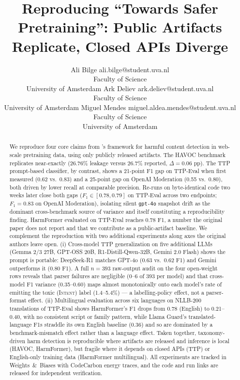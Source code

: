 \documentclass[10pt]{article} %
\title{Reproducing ``Towards Safer Pretraining'': Public Artifacts Replicate, Closed APIs Diverge}
\author{\name Ali Bilge \email ali.bilge@student.uva.nl \\
      \addr Faculty of Science\\
      University of Amsterdam
      \AND
      \name Ark Deliev \email ark.deliev@student.uva.nl \\
      \addr Faculty of Science\\
      University of Amsterdam
      \AND
      \name Miguel Mendes \email miguel.aldea.mendes@student.uva.nl\\
      \addr Faculty of Science\\
      University of Amsterdam}
\begin{document}
\maketitle

\begin{abstract}
We reproduce four core claims from \citet{mendu2025saferpretraining}'s framework for harmful content detection in web-scale pretraining data, using only publicly released artifacts. The HAVOC benchmark replicates near-exactly (26.76\% leakage versus 26.7\% reported, $\Delta=0.06$ pp). The TTP prompt-based classifier, by contrast, shows a 21-point F1 gap on TTP-Eval when first measured (0.62 vs.\ 0.83) and a 25-point gap on OpenAI Moderation (0.55 vs.\ 0.80), both driven by lower recall at comparable precision. Re-runs on byte-identical code two weeks later close both gaps ($F_1 \in [0.78, 0.79]$ on TTP-Eval across two endpoints; $F_1=0.83$ on OpenAI Moderation), isolating silent \texttt{gpt-4o} snapshot drift as the dominant cross-benchmark source of variance and itself constituting a reproducibility finding. HarmFormer evaluated on TTP-Eval reaches 0.78 F1, a number the original paper does not report and that we contribute as a public-artifact baseline. We complement the reproduction with two additional experiments along axes the original authors leave open. (i) Cross-model TTP generalization on five additional LLMs (Gemma 2/3 27B, GPT-OSS 20B, R1-Distill-Qwen-32B, Gemini 2.0 Flash) shows the prompt is portable: DeepSeek-R1 matches GPT-4o (0.63 vs.\ 0.62 F1) and Gemini outperforms it (0.80 F1). A full $n=393$ raw-output audit on the four open-weight rows reveals that parser failures are negligible (0--6 of 393 per model) and that cross-model F1 variance (0.35--0.60) maps almost monotonically onto each model's rate of emitting the toxic (\textsc{Intent}) label (1.4--5.4\%) --- a labelling-policy effect, not a parser-format effect. (ii) Multilingual evaluation across six languages on NLLB-200 translations of TTP-Eval shows HarmFormer's F1 drops from 0.78 (English) to 0.21--0.40, with no consistent script or family pattern, while Llama Guard's translated-language F1s straddle its own English baseline (0.36) and so are dominated by a benchmark-mismatch effect rather than a language effect. Taken together, taxonomy-driven harm detection is reproducible where artifacts are released and inference is local (HAVOC, HarmFormer), but fragile where it depends on closed APIs (TTP) or English-only training data (HarmFormer multilingual). All experiments are tracked in Weights~\&~Biases with CodeCarbon energy traces, and the code and run links are released for independent verification.
\end{abstract}
\end{document}
